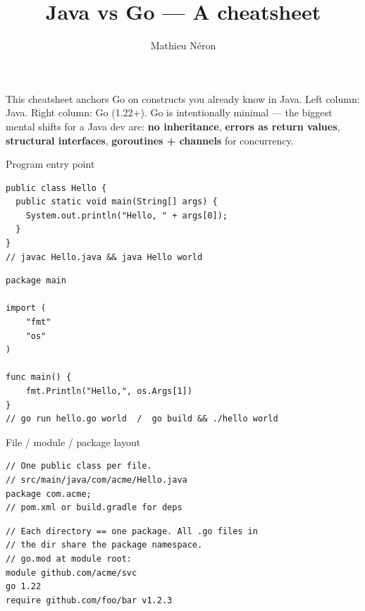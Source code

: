 \documentclass[10pt]{article}
\title{Java vs Go --- A cheatsheet}
\author{Mathieu N\'eron}
\begin{document}

\noindent\small This cheatsheet anchors Go on constructs you already know in Java.
Left column: Java. Right column: Go (1.22+). Go is intentionally minimal --- the
biggest mental shifts for a Java dev are: \textbf{no inheritance}, \textbf{errors as
return values}, \textbf{structural interfaces}, \textbf{goroutines + channels} for
concurrency.


\begin{construct}{Program entry point}
\noindent
\begin{minipage}[t]{0.485\linewidth}
\begin{lstlisting}[style=java, title=Java]
public class Hello {
  public static void main(String[] args) {
    System.out.println("Hello, " + args[0]);
  }
}
// javac Hello.java && java Hello world
\end{lstlisting}
\end{minipage}\hfill
\begin{minipage}[t]{0.485\linewidth}
\begin{lstlisting}[style=go, title=Go]
package main

import (
    "fmt"
    "os"
)

func main() {
    fmt.Println("Hello,", os.Args[1])
}
// go run hello.go world  /  go build && ./hello world
\end{lstlisting}
\end{minipage}
\end{construct}

\begin{construct}{File / module / package layout}
\noindent
\begin{minipage}[t]{0.485\linewidth}
\begin{lstlisting}[style=java, title=Java]
// One public class per file.
// src/main/java/com/acme/Hello.java
package com.acme;
// pom.xml or build.gradle for deps
\end{lstlisting}
\end{minipage}\hfill
\begin{minipage}[t]{0.485\linewidth}
\begin{lstlisting}[style=go, title=Go]
// Each directory == one package. All .go files in
// the dir share the package namespace.
// go.mod at module root:
module github.com/acme/svc
go 1.22
require github.com/foo/bar v1.2.3
\end{lstlisting}
\end{minipage}
\end{construct}
\end{document}
